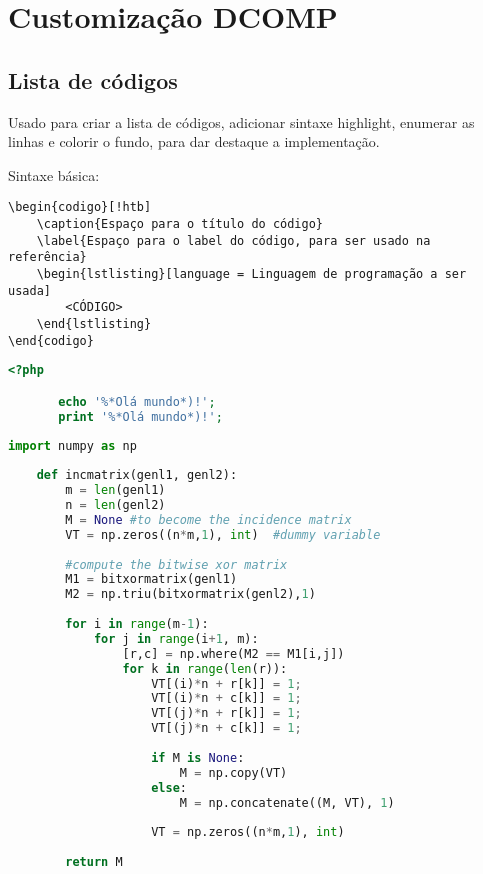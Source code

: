 \chapter{Customização DCOMP}

\section{Lista de códigos}

Usado para criar a lista de códigos, adicionar sintaxe highlight, enumerar as linhas e colorir o fundo, para dar destaque a implementação.

Sintaxe básica:
\begin{verbatim}
\begin{codigo}[!htb]
    \caption{Espaço para o título do código}
    \label{Espaço para o label do código, para ser usado na referência}  
    \begin{lstlisting}[language = Linguagem de programação a ser usada]
        <CÓDIGO>
    \end{lstlisting}
\end{codigo}
\end{verbatim}

\begin{codigo}[htb]
  \caption{Código PHP}
  \label{codigophp}
  \begin{lstlisting}[language = php]
       <?php

       echo '%*Olá mundo*)!';
       print '%*Olá mundo*)!';
  \end{lstlisting}
\end{codigo}

\begin{codigo}
  \caption{Código python}
  \label{codigopython}
  \begin{lstlisting}[language = python]
    import numpy as np
 
    def incmatrix(genl1, genl2):
        m = len(genl1)
        n = len(genl2)
        M = None #to become the incidence matrix
        VT = np.zeros((n*m,1), int)  #dummy variable
 
        #compute the bitwise xor matrix
        M1 = bitxormatrix(genl1)
        M2 = np.triu(bitxormatrix(genl2),1) 
 
        for i in range(m-1):
            for j in range(i+1, m):
                [r,c] = np.where(M2 == M1[i,j])
                for k in range(len(r)):
                    VT[(i)*n + r[k]] = 1;
                    VT[(i)*n + c[k]] = 1; 
                    VT[(j)*n + r[k]] = 1;
                    VT[(j)*n + c[k]] = 1;
 
                    if M is None:
                        M = np.copy(VT)
                    else:
                        M = np.concatenate((M, VT), 1)
 
                    VT = np.zeros((n*m,1), int)
 
        return M
\end{lstlisting}
\end{codigo}


